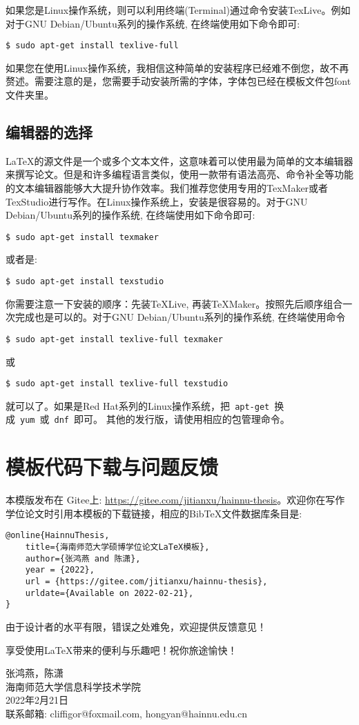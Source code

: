 如果您是Linux操作系统，则可以利用终端(Terminal)通过命令安装TexLive。例如对于GNU Debian/Ubuntu系列的操作系统, 在终端使用如下命令即可:
\begin{lstlisting}[frame=shadowbox]
	$ sudo apt-get install texlive-full
\end{lstlisting}
如果您在使用Linux操作系统，我相信这种简单的安装程序已经难不倒您，故不再赘述。需要注意的是，您需要手动安装所需的字体，字体包已经在模板文件包font文件夹里。

\subsection*{编辑器的选择}
\LaTeX 的源文件是一个或多个文本文件，这意味着可以使用最为简单的文本编辑器来撰写论文。但是和许多编程语言类似，使用一款带有语法高亮、命令补全等功能的文本编辑器能够大大提升协作效率。我们推荐您使用专用的TexMaker或者TexStudio进行写作。在Linux操作系统上，安装是很容易的。对于GNU Debian/Ubuntu系列的操作系统, 在终端使用如下命令即可:
\begin{lstlisting}[frame=shadowbox]
	$ sudo apt-get install texmaker
\end{lstlisting}
或者是:
\begin{lstlisting}[frame=shadowbox]
	$ sudo apt-get install texstudio
\end{lstlisting}
你需要注意一下安装的顺序：先装TeXLive, 再装TeXMaker。按照先后顺序组合一次完成也是可以的。对于GNU Debian/Ubuntu系列的操作系统, 在终端使用命令
\begin{lstlisting}[frame=shadowbox]
	$ sudo apt-get install texlive-full texmaker
\end{lstlisting}
或
\begin{lstlisting}[frame=shadowbox]
	$ sudo apt-get install texlive-full texstudio
\end{lstlisting}
就可以了。如果是Red Hat系列的Linux操作系统，把~\verb|apt-get|~换成~\verb|yum|~或~\verb|dnf|~即可。
其他的发行版，请使用相应的包管理命令。

\newpage

\section*{模板代码下载与问题反馈}

本模版发布在 Gitee上: \url{https://gitee.com/jitianxu/hainnu-thesis}。欢迎你在写作学位论文时引用本模板的下载链接，相应的BibTeX文件数据库条目是:
\begin{verbatim}
@online{HainnuThesis,
	title={海南师范大学硕博学位论文LaTeX模板},
	author={张鸿燕 and 陈潇},
	year = {2022},
	url = {https://gitee.com/jitianxu/hainnu-thesis},
	urldate={Available on 2022-02-21},	
}
\end{verbatim}

{由于设计者的水平有限，错误之处难免，欢迎提供反馈意见！}

享受使用{\LaTeX{}}带来的便利与乐趣吧！祝你旅途愉快！

\begin{flushright}
	张鸿燕，陈潇\\
	海南师范大学信息科学技术学院\\
	2022年2月21日\\
	联系邮箱: cliffigor@foxmail.com, hongyan@hainnu.edu.cn
\end{flushright}